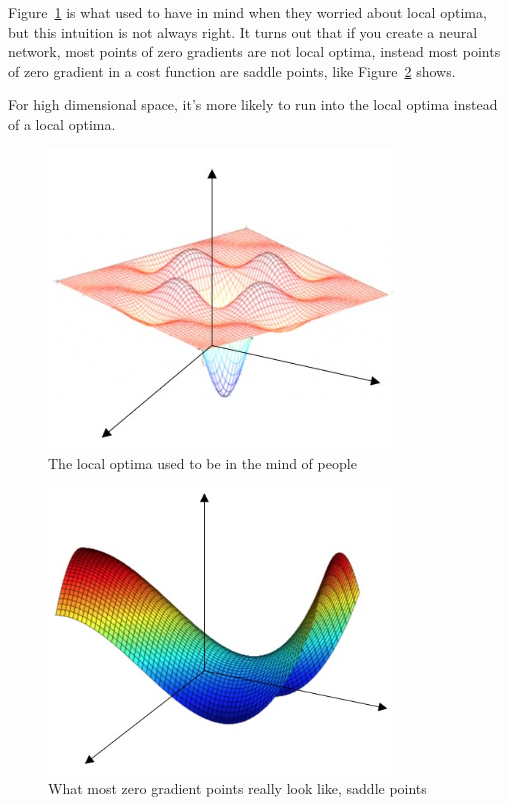 \documentclass[UTF8]{article}
\begin{document}
Figure~\ref{fig:local-optima-1} is what used to have in mind when they worried about local optima,
but this intuition is not always right. It turns out that if you create a neural network, most
points of zero gradients are not local optima, instead most points of zero gradient in a cost
function are saddle points, like Figure~\ref{fig:local-optima-2} shows.

For high dimensional space, it's more likely to run into the local optima instead of a local optima.

\begin{figure}[htb]
    \centering
    \includegraphics[width=25em]{figures/local-optima-1}
    \caption{The local optima used to be in the mind of people}
    \label{fig:local-optima-1}
\end{figure}

\begin{figure}[htb]
    \centering
    \includegraphics[width=25em]{figures/local-optima-2}
    \caption{What most zero gradient points really look like, saddle points}
    \label{fig:local-optima-2}
\end{figure}
\end{document}
